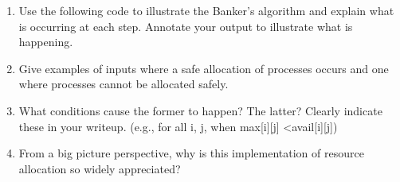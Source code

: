 \documentclass[11pt]{article}
\begin{document}
\begin{enumerate}

\item Use the following code to illustrate the Banker’s algorithm and explain what is occurring at each step. Annotate your output to illustrate what is happening.

\item Give examples of inputs where a safe allocation of processes occurs and one where processes cannot be allocated safely.

\item What conditions cause the former to happen? The latter? Clearly indicate these in your writeup. (e.g., for all i, j, when max[i][j] \textless avail[i][j])

\item From a big picture perspective, why is this implementation of resource allocation so widely appreciated?

\end{enumerate}
\end{document}

